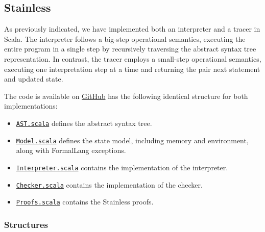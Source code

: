 
\subsection{Stainless}

As previously indicated, we have implemented both an interpreter and a tracer in Scala. The interpreter follows a big-step operational semantics, executing the entire program in a single step by recursively traversing the abstract syntax tree representation. In contrast, the tracer employs a small-step operational semantics, executing one interpretation step at a time and returning the pair next statement and updated state.

The code is available on \href{https://github.com/shilangyu/formal-lang/tree/main/lang/src/main/scala/lang}{GitHub} has the following identical structure for both implementations:

\begin{itemize}
  \item \href{https://github.com/shilangyu/formal-lang/blob/main/lang/src/main/scala/lang/AST.scala}{\texttt{AST.scala}} defines the abstract syntax tree.
  \item \href{https://github.com/shilangyu/formal-lang/blob/main/lang/src/main/scala/lang/Model.scala}{\texttt{Model.scala}} defines the state model, including memory and environment, along with FormalLang exceptions.
  \item \href{https://github.com/shilangyu/formal-lang/blob/main/lang/src/main/scala/lang/Interpreter.scala}{\texttt{Interpreter.scala}} contains the implementation of the interpreter.
  \item \href{https://github.com/shilangyu/formal-lang/blob/main/lang/src/main/scala/lang/Checker.scala}{\texttt{Checker.scala}} contains the implementation of the checker.
  \item \href{https://github.com/shilangyu/formal-lang/blob/main/lang/src/main/scala/lang/Proofs.scala}{\texttt{Proofs.scala}} contains the Stainless proofs.
\end{itemize}


\subsubsection{Structures}

